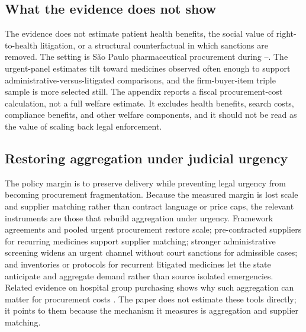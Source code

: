 \subsection{What the evidence does not show}
\label{subsec:limits}

The evidence does not estimate patient health benefits, the social value of right-to-health litigation, or a structural counterfactual in which sanctions are removed. The setting is S\~ao Paulo pharmaceutical procurement during \BPsampleStartYear--\BPsampleEndYear. The urgent-panel estimates tilt toward medicines observed often enough to support administrative-versus-litigated comparisons, and the firm-buyer-item triple sample is more selected still. The appendix reports a fiscal procurement-cost calculation, not a full welfare estimate. It excludes health benefits, search costs, compliance benefits, and other welfare components, and it should not be read as the value of scaling back legal enforcement.

\subsection{Restoring aggregation under judicial urgency}
\label{subsec:policy_tools}

The policy margin is to preserve delivery while preventing legal urgency from becoming procurement fragmentation. Because the measured margin is lost scale and supplier matching rather than contract language or price caps, the relevant instruments are those that rebuild aggregation under urgency. Framework agreements and pooled urgent procurement restore scale; pre-contracted suppliers for recurring medicines support supplier matching; stronger administrative screening widens an urgent channel without court sanctions for admissible cases; and inventories or protocols for recurrent litigated medicines let the state anticipate and aggregate demand rather than source isolated emergencies. Related evidence on hospital group purchasing shows why such aggregation can matter for procurement costs \citep{lin2025value}. The paper does not estimate these tools directly; it points to them because the mechanism it measures is aggregation and supplier matching.
